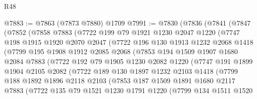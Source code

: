 \begin{lexlean}{R48}
\begin{coremodule}
@7883 := @7863 (@7873 @7880) @1709
@7991 := @7830
    (@7836
      (@7841
        (@7847
          (@7852
            (@7858
              @7883
              (@7722
                @199
                @79
                @1921
                @1230
                @2047
                @1220
                (@7747
                  @198
                  @1915
                  @1920
                  @2070
                  @2047
                  (@7722
                    @196
                    @130
                    @1913
                    @1232
                    @2068
                    @1418
                    (@7799
                      @195
                      @1908
                      @1912
                      @2085
                      @2068
                      (@7853
                        @194
                        @1509
                        @1907
                        @1680
                        @2084
                        @7883
                        (@7722
                          @192
                          @79
                          @1905
                          @1230
                          @2082
                          @1220
                          (@7747
                            @191
                            @1899
                            @1904
                            @2105
                            @2082
                            (@7722
                              @189
                              @130
                              @1897
                              @1232
                              @2103
                              @1418
                              (@7799
                                @188
                                @1892
                                @1896
                                @2118
                                @2103
                                (@7853
                                  @187
                                  @1509
                                  @1891
                                  @1680
                                  @2117
                                  @7883
                                  (@7722
                                    @135
                                    @79
                                    @1521
                                    @1230
                                    @1791
                                    @1220
                                    (@7799
                                      @134
                                      @1511
                                      @1520

\end{coremodule}
\end{lexlean}
